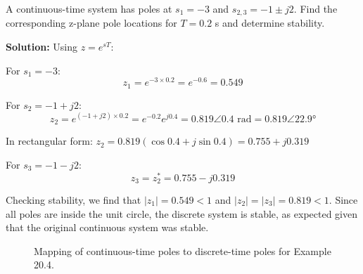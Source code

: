 \begin{example}
A continuous-time system has poles at $s_1 = -3$ and $s_{2,3} = -1 \pm j2$. Find the corresponding z-plane pole locations for $T = 0.2$ s and determine stability.

\textbf{Solution:} Using $z = e^{sT}$:

For $s_1 = -3$:
\begin{equation}
z_1 = e^{-3 \times 0.2} = e^{-0.6} = 0.549
\end{equation}

For $s_2 = -1 + j2$:
\begin{equation}
z_2 = e^{(-1+j2) \times 0.2} = e^{-0.2} e^{j0.4} = 0.819 \angle 0.4 \text{ rad} = 0.819 \angle 22.9°
\end{equation}

In rectangular form: $z_2 = 0.819(\cos 0.4 + j\sin 0.4) = 0.755 + j0.319$

For $s_3 = -1 - j2$:
\begin{equation}
z_3 = z_2^* = 0.755 - j0.319
\end{equation}

Checking stability, we find that $|z_1| = 0.549 < 1$ and $|z_2| = |z_3| = 0.819 < 1$. Since all poles are inside the unit circle, the discrete system is stable, as expected given that the original continuous system was stable.

\begin{figure}[H]
\centering
{}
\caption{Mapping of continuous-time poles to discrete-time poles for Example 20.4.}
\end{figure}
\end{example}

